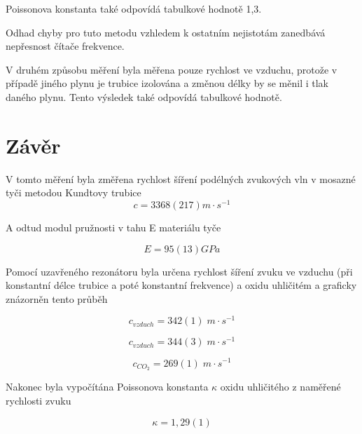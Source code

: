 Poissonova konstanta také odpovídá tabulkové hodnotě 1,3.

Odhad chyby pro tuto metodu vzhledem k ostatním nejistotám zanedbává nepřesnost čítače frekvence.

V druhém způsobu měření byla měřena pouze rychlost ve vzduchu, protože v případě jiného plynu je trubice izolována a změnou délky by se měnil i tlak daného plynu. Tento výsledek také odpovídá tabulkové hodnotě.

\section{Závěr}

V tomto měření byla změřena rychlost šíření podélných zvukových vln v mosazné tyči metodou Kundtovy trubice
\begin{equation}
    \nonumber
    c = 3368(217) m \cdot s^{-1}
\end{equation}

A odtud modul pružnosti v tahu E materiálu tyče

\begin{equation}
    \nonumber
    E = 95(13) GPa
\end{equation}

\newpage

Pomocí uzavřeného rezonátoru byla určena rychlost šíření zvuku ve vzduchu (při konstantní délce trubice a poté konstantní frekvence) a oxidu uhličitém a graficky znázorněn tento průběh

\begin{equation}
    \nonumber
    c_{vzduch} = 342(1) \; m \cdot s^{-1}
\end{equation}

\begin{equation}
    \nonumber
    c_{vzduch} = 344(3) \; m \cdot s^{-1}
\end{equation}

\begin{equation}
    \nonumber
    c_{CO_2} = 269(1) \; m \cdot s^{-1}
\end{equation}

Nakonec byla vypočítána Poissonova konstanta \(\kappa\) oxidu uhličitého z naměřené rychlosti zvuku

\begin{equation}
    \nonumber
    \kappa = 1,29(1)
\end{equation}